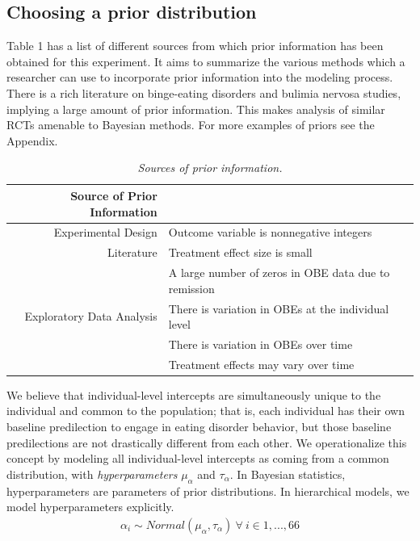\documentclass{article}
\begin{document}
\subsection*{Choosing a prior distribution}
Table 1 has a list of different sources from which prior information has been obtained for this experiment. It aims to summarize the various methods which a researcher can use to incorporate prior information into the modeling process. There is a rich literature on binge-eating disorders and bulimia nervosa studies, implying a large amount of prior information. This makes analysis of similar RCTs amenable to Bayesian methods. For more examples of priors see the Appendix.
%
\begin{table}[H]
\centering
\begin{tabular}{r l}
  Source of Prior Information &  \\ 
  \hline  \vspace{0.25em}
  Experimental Design & Outcome variable is nonnegative integers \\
  \vspace{0.25em}
  Literature & Treatment effect size is small \\
                  & A large number of zeros in OBE data due to remission\\
  Exploratory Data Analysis & There is variation in OBEs at the individual level \\
					  & There is variation in OBEs over time \\
                                            & Treatment effects may vary over time \\
    \hline
\end{tabular}
\caption{\emph{Sources of prior information.}}
\end{table}
%
We believe that individual-level intercepts are simultaneously unique to the individual and common to the population; that is, each individual has their own baseline predilection to engage in eating disorder behavior, but those baseline predilections are not drastically different from each other.  We operationalize this concept by modeling all individual-level intercepts as coming from a common distribution, with \emph{hyperparameters} $\mu_{\alpha}$ and $\tau_{\alpha}$.  In Bayesian statistics, hyperparameters are parameters of prior distributions.  In hierarchical models, we model hyperparameters explicitly.
%
\begin{align}
\alpha_i \sim Normal(\mu_{\alpha}, \tau_{\alpha}) \ \forall \ i \in 1,...,66
\end{align} 
\end{document}
